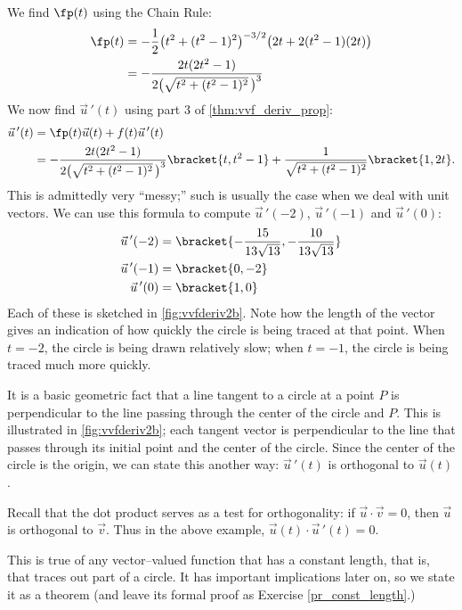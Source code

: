 {\begin{enumerate}
We find $\fp(t)$ using the Chain Rule:
\begin{align*}
\fp(t) &= -\frac12\big(t^2+(t^2-1)^2\big)^{-3/2}\big(2t+2(t^2-1)(2t)\big)\\
			&= -\frac{2t(2t^2-1)}{2\big(\sqrt{t^2+(t^2-1)^2}\,\big)^3}
\end{align*}
We now find $\vec u\,'(t)$ using part 3 of \autoref{thm:vvf_deriv_prop}:
\begin{align*}
\vec u\,'(t) &=  \fp(t)\vec u(t) + f(t)\vec u\,'(t) \\
				&=  -\frac{2t(2t^2-1)}{2\big(\sqrt{t^2+(t^2-1)^2}\,\big)^3}\bracket{t,t^2-1}+ \frac{1}{\sqrt{t^2+(t^2-1)^2}}\bracket{1,2t}.
\end{align*}
This is admittedly very ``messy;'' such is usually the case when we deal with unit vectors. We can use this formula to compute $\vec u\,'(-2)$, $\vec u\,'(-1)$ and $\vec u\,'(0)$:
\begin{align*}
\vec u\,'(-2) &=\bracket{-\frac{15}{13 \sqrt{13}},-\frac{10}{13
   \sqrt{13}}}%
   \\
\vec u\,'(-1) &=\bracket{0,-2}\\
\vec u\,'(0) &=\bracket{1,0}
\end{align*}
Each of these is sketched in \autoref{fig:vvfderiv2b}. Note how the length of the vector gives an indication of how quickly the circle is being traced at that point. When $t=-2$, the circle is being drawn relatively slow; when $t=-1$, the circle is being traced much more quickly.\eoehere
\end{enumerate}}

It is a basic geometric fact that a line tangent to a circle at a point $P$ is perpendicular to the line passing through the center of the circle and $P$. This is illustrated in \autoref{fig:vvfderiv2b}; each tangent vector is perpendicular to the line that passes through its initial point and the center of the circle. Since the center of the circle is the origin, we can state this another way: $\vec u\,'(t)$ is orthogonal to $\vec u(t)$.

Recall that the dot product serves as a test for orthogonality: if $\vec u\cdot \vec v = 0$, then $\vec u$ is orthogonal to $\vec v$. Thus in the above example, $\vec u(t)\cdot \vec u\,'(t)=0$.

This is true of any vector--valued function that has a constant length, that is, that traces out part of a circle. It has important implications later on, so we state it as a theorem (and leave its formal proof as Exercise \ref{pr_const_length}.)

